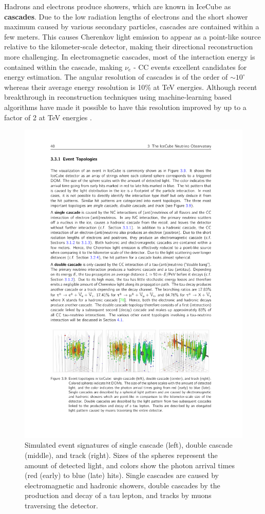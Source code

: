 Hadrons and electrons produce showers, which are known in IceCube as \textbf{cascades}. Due to the low radiation lengths of electrons and the short shower maximum caused by various secondary particles, cascades are contained within a few meters. This causes Cherenkov light emission to appear as a point-like source relative to the kilometer-scale detector, making their directional reconstruction more challenging. In electromagnetic cascades, most of the interaction energy is contained within the cascade, making $\nu_{e}$ - CC events excellent candidates for energy estimation. The angular resolution of cascades is of the order of $\sim 10^\circ$ whereas their average energy resolution is 10\% at TeV energies. Although recent breakthrough in reconstruction techniques using machine-learning based algorithms have made it possible to have this resolution improved by up to a factor of 2 at TeV energies .

\begin{figure}
	\centering \includegraphics{./figures/nu_in_icecube/topologies.pdf}
	\caption[Event signatures in IceCube]{Simulated event signatures of single cascade (left), double cascade (middle), and track (right). Sizes of the spheres represent the amount of detected light, and colors show the photon arrival times (red (early) to blue (late) hits). Single cascades are caused by electromagnetic and hadronic showers, double cascades by the production and decay of a tau lepton, and tracks by muons traversing the detector.}
\end{figure}

